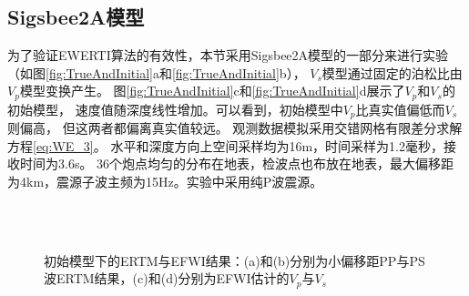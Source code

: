 \subsection{Sigsbee2A模型}
为了验证EWERTI算法的有效性，本节采用Sigsbee2A模型的一部分来进行实验（如图\ref{fig:TrueAndInitial}a和\ref{fig:TrueAndInitial}b），
$V_s$模型通过固定的泊松比由$V_p$模型变换产生。
图\ref{fig:TrueAndInitial}c和\ref{fig:TrueAndInitial}d展示了$V_p$和$V_s$的初始模型，
速度值随深度线性增加。可以看到，初始模型中$V_p$比真实值偏低而$V_s$则偏高，
但这两者都偏离真实值较远。
观测数据模拟采用交错网格有限差分求解方程\eqref{eq:WE_3}。
水平和深度方向上空间采样均为16m，时间采样为1.2毫秒，接收时间为3.6s。
36个炮点均匀的分布在地表，检波点也布放在地表，最大偏移距为4km，震源子波主频为15Hz。实验中采用纯P波震源。

\begin{figure}[!htb]
   \centering
   \\
   \\
   \caption{初始模型下的ERTM与EFWI结果：(a)和(b)分别为小偏移距PP与PS波ERTM结果，(c)和(d)分别为EFWI估计的$V_p$与$V_s$}
   \label{fig:Results_init}
\end{figure}
